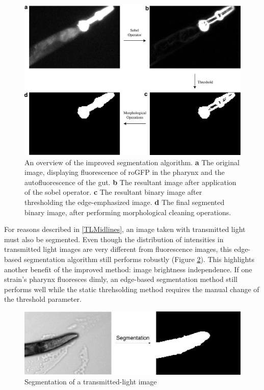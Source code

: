 \begin{figure}[ht]
    \centering
    \includegraphics[scale=.40]{Figures/rendered_files/sobel}
    \decoRule
    \caption[Overview of the improved segmentation algorithm]{An overview of the improved segmentation algorithm. \textbf{a} The original image, displaying fluorescence of roGFP in the pharynx and the autofluorescence of the gut. \textbf{b} The resultant image after application of the sobel operator. \textbf{c} The resultant binary image after thresholding the edge-emphasized image. \textbf{d} The final segmented binary image, after performing morphological cleaning operations.}
    \label{fig:NewPipeline}
\end{figure}

For reasons described in \ref{TLMidlines}, an image taken with transmitted light must also be segmented. Even though the distribution of intensities in transmitted light images are very different from fluorescence images, this edge-based segmentation algorithm still performs robustly (Figure \ref{fig:TLSeg}). This highlights another benefit of the improved method: image brightness independence. If one strain's pharynx fluoresces dimly, an edge-based segmentation method still performs well while the static threhsolding method requires the manual change of the threshold parameter.

\begin{figure}[ht]
    \centering
    \includegraphics[scale=.30]{Figures/rendered_files/tl_segmentation}
    \decoRule
    \caption[Segmentation of a transmitted-light image]{Segmentation of a transmitted-light image}
    \label{fig:TLSeg}
\end{figure}


